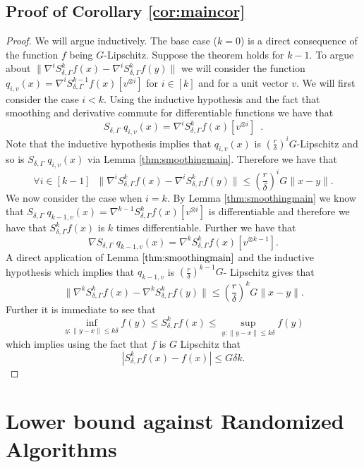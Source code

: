 \subsection{Proof of Corollary \ref{cor:maincor}}

\begin{proof}
We will argue inductively. The base case ($k=0$) is a direct consequence of the function $f$ being $G$-Lipschitz. Suppose the theorem holds for $k-1$. To argue about $\|\nabla^{i} S_{\delta,\Gamma}^k f(x) - \nabla^{i} S_{\delta,\Gamma}^k f(y)\|$ we will consider the function $q_{i,v}(x) = \nabla^{i} S_{\delta,\Gamma}^{k-1} f(x)[v^{\otimes i}]$ for $i \in [k]$ and for a unit vector $v$. 
We will first consider the case $i < k$. Using the inductive hypothesis and the fact that smoothing and derivative commute for differentiable functions we have that 
\[S_{\delta, \Gamma}\;q_{i,v}(x) = \nabla^i S_{\delta, \Gamma}^k  f(x)[v^{\otimes i}]\enspace.\]
Note that the inductive hypothesis implies that $q_{i,v}(x)$ is $\left(\frac{r}{\delta}\right)^{i}G$-Lipschitz and so is $S_{\delta, \Gamma}\;q_{i,v}(x)$ via Lemma \ref{thm:smoothingmain}. Therefore we have that 
\[ \forall i \in [k-1] \;\; \| \nabla^{i} S_{\delta,\Gamma}^k f(x) - \nabla^{i} S_{\delta,\Gamma}^k f(y)\| \leq \left(\frac{r}{\delta} \right)^iG\|x-y\|.\]
We now consider the case when $i = k$. By Lemma \ref{thm:smoothingmain} we know that $S_{\delta, \Gamma}\;q_{k-1,v}(x) = \nabla^{k-1} S_{\delta, \Gamma}^k  f(x)[v^{\otimes i}]$ is differentiable and therefore we have that $S_{\delta, \Gamma}^k  f(x)$ is $k$ times differentiable. Further we have that 
\[\nabla S_{\delta, \Gamma} \; q_{k-1,v}(x) = \nabla^{k} S_{\delta,\Gamma}^k f(x)[v^{\otimes k-1}].\]
A direct application of Lemma $\ref{thm:smoothingmain}$ and the inductive hypothesis which implies that $q_{k-1,v}$ is $\left( \frac{r}{\delta}\right)^{k-1}G$- Lipschitz gives that 
\[ \|\nabla^{k} S_{\delta,\Gamma}^k f(x) - \nabla^{k} S_{\delta,\Gamma}^k f(y)\| \leq \left(\frac{r}{\delta}\right)^{k}G\|x-y\|.\]
Further it is immediate to see that 
\[ \inf_{y: \|y - x\| \leq k\delta} f(y) \leq S_{\delta, \Gamma}^k f(x) \leq \sup_{y: \|y - x\| \leq k\delta} f(y)\]
which implies using the fact that $f$ is $G$ Lipschitz that 
\[| S_{\delta,\Gamma}^k f(x) - f(x)| \leq G\delta k .\]


\end{proof}



\section{Lower bound against Randomized Algorithms}

